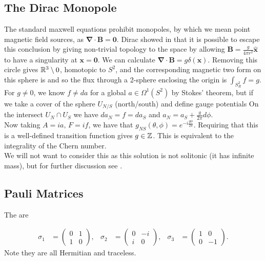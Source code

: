 \documentclass{article}
\begin{document}
\subsection{The Dirac Monopole}
The standard maxwell equations prohibit monopoles, by which we mean point magnetic field sources, as $\bm{\nabla}\cdot \bm{B}=\bm{0}$. Dirac showed in \cite{Dirac1931} that it is possible to escape this conclusion by giving non-trivial topology to the space by allowing $\bm{B} = \frac{g}{4\pi r^2}\hat{\bm{x}}$ to have a singularity at $\bm{x}=\bm{0}$. We can calculate $\bm{\nabla} \cdot \bm{B} = g\delta(\bm{x})$. Removing this circle gives $\mathbb{R}^3\setminus 0$, homotopic to $S^2$, and the corresponding magnetic two form on this sphere is
and so the flux through a 2-sphere enclosing the origin is $\int_{S_R^2} f = g $. For $g \neq 0$, we know $f \neq da$ for a global $a \in \Omega^1(S^2)$ by Stokes' theorem, but if we take a cover of the sphere $U_{N/S}$ (north/south) and define gauge potentials
On the intersect $U_N \cap U_S$ we have $da_N = f = da_S$ and $a_N = a_S + \frac{g}{2\pi}d\phi$. \\
Now taking $A = ia, \, F = if$, we have that $g_{NS}(\theta,\phi) = e^{-i\frac{g\phi}{2\pi}}$. Requiring that this is a well-defined transition function gives $g \in \mathbb{Z}$. This is equivalent to the integrality of the Chern number. \\
We will not want to consider this as this solution is not solitonic (it has infinite mass), but for further discussion see \cite{Manton2004}. 

\subsection{Pauli Matrices}

\begin{definition}
	The  are
	
	\begin{align*}
		\sigma_1 &= \begin{pmatrix} 0 & 1 \\ 1 & 0\end{pmatrix}, & 
		\sigma_2 &= \begin{pmatrix} 0 & -i \\ i & 0\end{pmatrix}, &  
		\sigma_3 &= \begin{pmatrix} 1 & 0 \\ 0 & -1\end{pmatrix}.  
	\end{align*}
	Note they are all Hermitian and traceless.
\end{definition}
\end{document}
